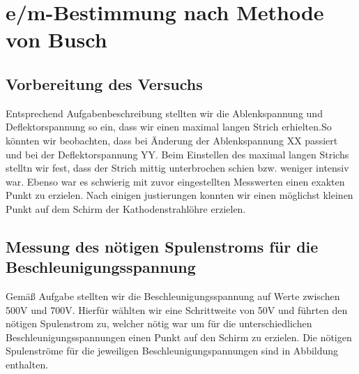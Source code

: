 \chapter{e/m-Bestimmung nach Methode von Busch}
\section{Vorbereitung des Versuchs}
Entsprechend Aufgabenbeschreibung stellten wir die Ablenkspannung und  Deflektorspannung so ein, dass wir einen maximal langen Strich erhielten.So könnten wir beobachten, dass bei Änderung der Ablenkspannung XX passiert und bei der Deflektorspannung YY. Beim Einstellen des maximal langen Strichs stelltn wir fest, dass der Strich mittig unterbrochen schien bzw. weniger intensiv war. Ebenso war es schwierig mit zuvor eingestellten Messwerten einen exakten Punkt zu erzielen. Nach einigen justierungen konnten wir einen möglichst kleinen Punkt auf dem Schirm der Kathodenstrahlöhre erzielen.
\section{Messung des nötigen Spulenstroms für die Beschleunigungsspannung}
Gemäß Aufgabe stellten wir die Beschleunigungsspannung auf Werte zwischen 500V und 700V. Hierfür wählten wir eine Schrittweite von 50V und führten den nötigen Spulenstrom zu, welcher nötig war um für die unterschiedlichen Beschleunigungsspannungen einen Punkt auf den Schirm zu erzielen. Die nötigen Spulenströme für die jeweiligen Beschleunigungspannungen sind in Abbildung enthalten.

